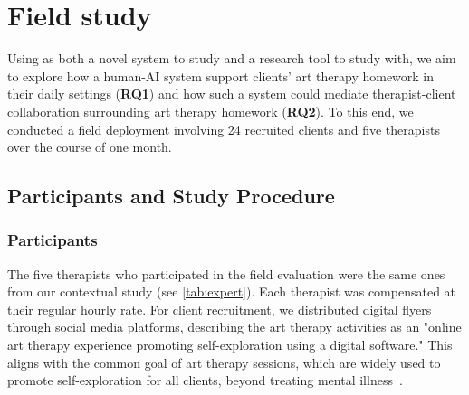 \section{Field study}
Using \name{} as both a novel system to study and a research tool to study with, we aim to explore how a human-AI system support clients' art therapy homework in their daily settings (\textbf{RQ1}) and how such a system could mediate therapist-client collaboration surrounding art therapy homework (\textbf{RQ2}). To this end, we conducted a field deployment involving 24 recruited clients and five therapists over the course of one month.



\subsection{Participants and Study Procedure}
\subsubsection{Participants}

The five therapists who participated in the field evaluation were the same ones from our contextual study (see \autoref{tab:expert}). Each therapist was compensated at their regular hourly rate.
For client recruitment, we distributed digital flyers through social media platforms, describing the art therapy activities as an "online art therapy experience promoting self-exploration using a digital software." This aligns with the common goal of art therapy sessions, which are widely used to promote self-exploration for all clients, beyond treating mental illness~\cite{kahn1999art, riley2003family}.

